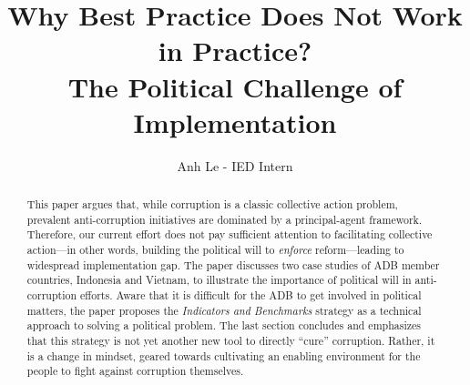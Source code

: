 \documentclass[12pt]{article}
\title{Why Best Practice Does Not Work in Practice?\\
        The Political Challenge of Implementation}
\author{Anh Le - IED Intern}
\date{}
\begin{document}
\maketitle

\begin{abstract}
This paper argues that, while corruption is a classic collective action problem, prevalent anti-corruption initiatives are dominated by a principal-agent framework. Therefore, our current effort does not pay sufficient attention to facilitating collective action---in other words, building the political will to \textit{enforce} reform---leading to widespread implementation gap. The paper discusses two case studies of ADB member countries, Indonesia and Vietnam, to illustrate the importance of political will in anti-corruption efforts. Aware that it is difficult for the ADB to get involved in political matters, the paper proposes the \textit{Indicators and Benchmarks} strategy as a technical approach to solving a political problem. The last section concludes and emphasizes that this strategy is not yet another new tool to directly ``cure'' corruption. Rather, it is a change in mindset, geared towards cultivating an enabling environment for the people to fight against corruption themselves.
\end{abstract}

\newpage
\thispagestyle{plain}
\begin{singlespace}
  \tableofcontents
  \listoffigures
\end{singlespace}
\begin{doublespace}
  \renewcommand{\figurename}{Box}
\end{doublespace}
\end{document}
